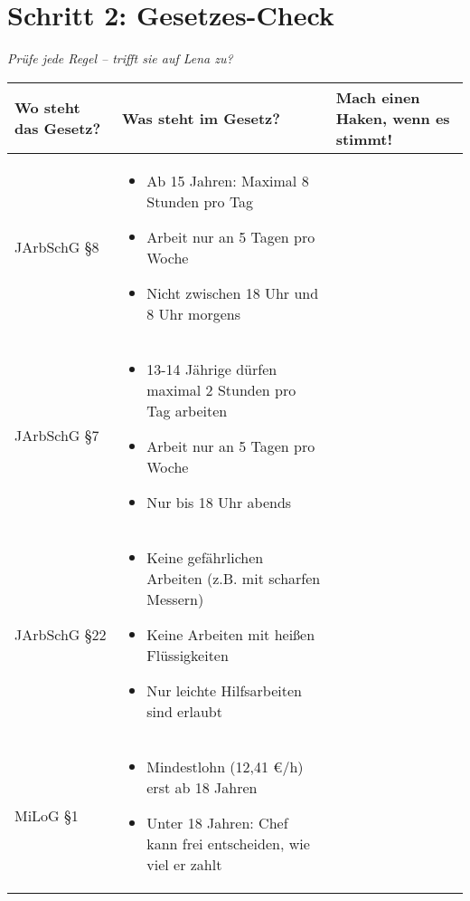 \documentclass[12pt, a4paper]{article}
\newenvironment{taskbox}{%
	\begin{framed}
		\color{black}
	}{%
	\end{framed}
}
\newcommand{\checkbox}{\raisebox{-0.2ex}{\Large$\square$}}
\begin{document}
	\vspace{0.3cm}
	
	\section*{\color{taskblue}Schritt 2: Gesetzes-Check}
	
	\begin{taskbox}
		\textit{Prüfe jede Regel – trifft sie auf Lena zu?}
		
		\begin{tabular}{|p{4cm}|p{8cm}|p{3cm}|}
			\hline
			\textbf{Wo steht das Gesetz?} & \textbf{Was steht im Gesetz?} & \textbf{Mach einen Haken, wenn es stimmt!} \\ 
			\hline
			JArbSchG §8 & \begin{minipage}[t]{8cm}
				\begin{itemize}[leftmargin=*,nosep]
					\item Ab 15 Jahren: Maximal 8 Stunden pro Tag
					\item Arbeit nur an 5 Tagen pro Woche
					\item Nicht zwischen 18 Uhr und 8 Uhr morgens
				\end{itemize}
			\end{minipage} & \checkbox \\ 
			\hline
			JArbSchG §7 & \begin{minipage}[t]{8cm}
				\begin{itemize}[leftmargin=*,nosep]
					\item 13-14 Jährige dürfen maximal 2 Stunden pro Tag arbeiten
					\item Arbeit nur an 5 Tagen pro Woche
					\item Nur bis 18 Uhr abends
				\end{itemize}
			\end{minipage} & \checkbox \\ 
			\hline
			JArbSchG §22 & \begin{minipage}[t]{8cm}
				\begin{itemize}[leftmargin=*,nosep]
					\item Keine gefährlichen Arbeiten (z.B. mit scharfen Messern)
					\item Keine Arbeiten mit heißen Flüssigkeiten
					\item Nur leichte Hilfsarbeiten sind erlaubt
				\end{itemize}
			\end{minipage} & \checkbox \\ 
			\hline
			MiLoG §1 & \begin{minipage}[t]{8cm}
				\begin{itemize}[leftmargin=*,nosep]
					\item Mindestlohn (12,41 €/h) erst ab 18 Jahren
					\item Unter 18 Jahren: Chef kann frei entscheiden, wie viel er zahlt
				\end{itemize}
			\end{minipage} & \checkbox \\ 
			\hline
		\end{tabular}
	\end{taskbox}
	
\end{document}
